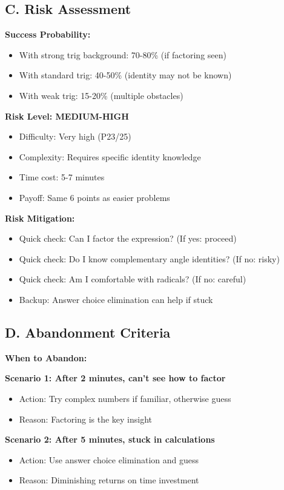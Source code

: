 \documentclass[12pt]{article}
\begin{document}
\begin{competitionbox}
\subsection*{C. Risk Assessment}

\textbf{Success Probability:}
\begin{itemize}
    \item With strong trig background: 70-80\% (if factoring seen)
    \item With standard trig: 40-50\% (identity may not be known)
    \item With weak trig: 15-20\% (multiple obstacles)
\end{itemize}

\textbf{Risk Level: MEDIUM-HIGH}
\begin{itemize}
    \item Difficulty: Very high (P23/25)
    \item Complexity: Requires specific identity knowledge
    \item Time cost: 5-7 minutes
    \item Payoff: Same 6 points as easier problems
\end{itemize}

\textbf{Risk Mitigation:}
\begin{itemize}
    \item Quick check: Can I factor the expression? (If yes: proceed)
    \item Quick check: Do I know complementary angle identities? (If no: risky)
    \item Quick check: Am I comfortable with radicals? (If no: careful)
    \item Backup: Answer choice elimination can help if stuck
\end{itemize}

\subsection*{D. Abandonment Criteria}

\textbf{When to Abandon:}

\textbf{Scenario 1: After 2 minutes, can't see how to factor}
\begin{itemize}
    \item Action: Try complex numbers if familiar, otherwise guess
    \item Reason: Factoring is the key insight
\end{itemize}

\textbf{Scenario 2: After 5 minutes, stuck in calculations}
\begin{itemize}
    \item Action: Use answer choice elimination and guess
    \item Reason: Diminishing returns on time investment
\end{itemize}


\end{competitionbox}
\end{document}
